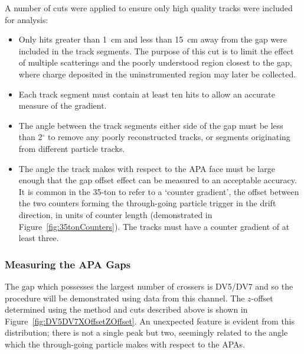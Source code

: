A number of cuts were applied to ensure only high quality tracks were included for analysis:
\begin{itemize}
  \item{Only hits greater than 1~cm and less than 15~cm away from the gap were included in the track segments.  The purpose of this cut is to limit the effect of multiple scatterings and the poorly understood region closest to the gap, where charge deposited in the uninstrumented region may later be collected.}
  \item{Each track segment must contain at least ten hits to allow an accurate measure of the gradient.}
  \item{The angle between the track segments either side of the gap must be less than 2$^\circ$ to remove any poorly reconstructed tracks, or segments originating from different particle tracks.}
  \item{The angle the track makes with respect to the APA face must be large enough that the gap offset effect can be measured to an acceptable accuracy.  It is common in the 35-ton to refer to a `counter gradient', the offset between the two counters forming the through-going particle trigger in the drift direction, in units of counter length (demonstrated in Figure~\ref{fig:35tonCounters}).  The tracks must have a counter gradient of at least three.}
\end{itemize}

\subsubsection{Measuring the APA Gaps}\label{sec:MeasuringAPAGaps}

The gap which possesses the largest number of crossers is DV5/DV7 and so the procedure will be demonstrated using data from this channel.  The $z$-offset determined using the method and cuts described above is shown in Figure~\ref{fig:DV5DV7XOffsetZOffset}.  An unexpected feature is evident from this distribution; there is not a single peak but two, seemingly related to the angle which the through-going particle makes with respect to the APAs.

